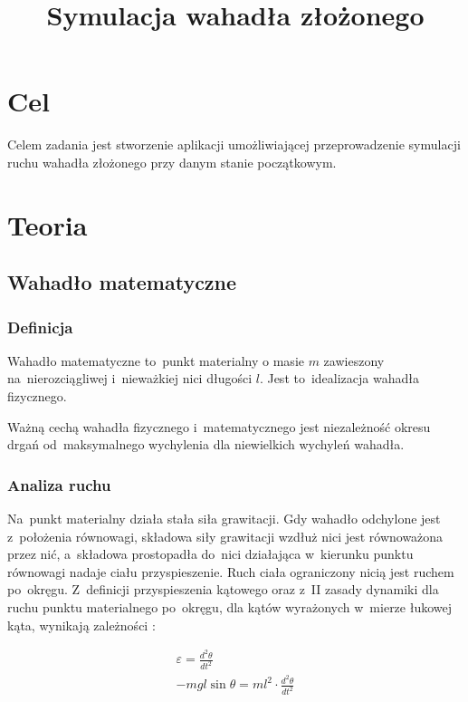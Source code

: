 \documentclass{classrep}
\author{\studentinfo{Paweł Placzyński}{143072}}
\title{Symulacja wahadła złożonego}
\begin{document}
\maketitle

\section{Cel}

Celem zadania jest stworzenie aplikacji umożliwiającej przeprowadzenie symulacji
ruchu wahadła złożonego przy danym stanie początkowym.

\section{Teoria}

\subsection{Wahadło matematyczne}

\subsubsection{Definicja}

Wahadło matematyczne \cite{skorko} to~punkt materialny o masie $ m $ zawieszony
na~nierozciągliwej i~nieważkiej nici długości $ l $. Jest to~idealizacja wahadła
fizycznego.


Ważną cechą wahadła fizycznego i~matematycznego jest niezależność okresu drgań
od~maksymalnego wychylenia dla niewielkich wychyleń wahadła.

\subsubsection{Analiza ruchu}

Na~punkt materialny działa stała siła grawitacji. Gdy wahadło odchylone jest
z~położenia równowagi, składowa siły grawitacji wzdłuż nici jest równoważona
przez nić, a~składowa prostopadła do~nici działająca w~kierunku punktu równowagi
nadaje ciału przyspieszenie. Ruch ciała ograniczony nicią jest ruchem
po~okręgu. Z~definicji przyspieszenia kątowego oraz z~II zasady dynamiki dla
ruchu punktu materialnego po~okręgu, dla kątów wyrażonych w~mierze łukowej kąta,
wynikają zależności \cite{tablice}:

\begin{equation}
  \begin{array}{c}
    \varepsilon = \frac{d^{2}\theta }{dt^{2}} \\
    -mg l \sin \theta = ml^{2} \cdot \frac{d^{2}\theta }{dt^{2}}
  \end{array}
\end{equation}
\end{document}
